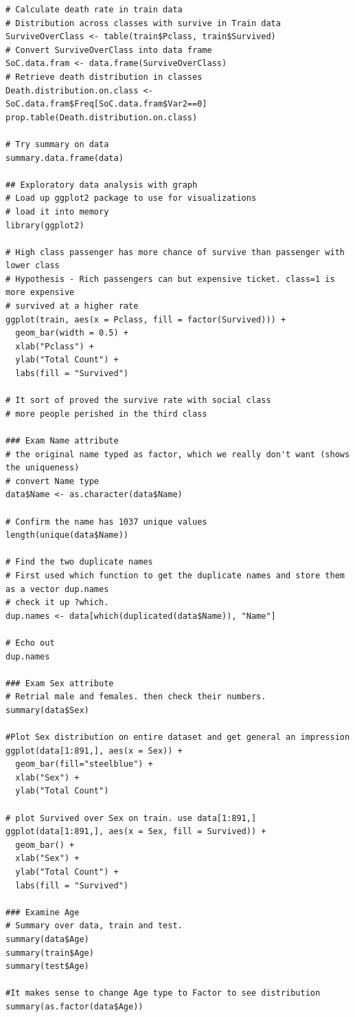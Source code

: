\documentclass[
]{book}
\begin{document}
\begin{verbatim}
# Calculate death rate in train data
# Distribution across classes with survive in Train data
SurviveOverClass <- table(train$Pclass, train$Survived)
# Convert SurviveOverClass into data frame
SoC.data.fram <- data.frame(SurviveOverClass)
# Retrieve death distribution in classes
Death.distribution.on.class <- SoC.data.fram$Freq[SoC.data.fram$Var2==0]
prop.table(Death.distribution.on.class)

# Try summary on data
summary.data.frame(data)

## Exploratory data analysis with graph
# Load up ggplot2 package to use for visualizations
# load it into memory
library(ggplot2)

# High class passenger has more chance of survive than passenger with lower class
# Hypothesis - Rich passengers can but expensive ticket. class=1 is more expensive
# survived at a higher rate
ggplot(train, aes(x = Pclass, fill = factor(Survived))) +
  geom_bar(width = 0.5) +
  xlab("Pclass") +
  ylab("Total Count") +
  labs(fill = "Survived")

# It sort of proved the survive rate with social class
# more people perished in the third class

### Exam Name attribute
# the original name typed as factor, which we really don't want (shows the uniqueness)
# convert Name type
data$Name <- as.character(data$Name)

# Confirm the name has 1037 unique values
length(unique(data$Name))

# Find the two duplicate names
# First used which function to get the duplicate names and store them as a vector dup.names
# check it up ?which.
dup.names <- data[which(duplicated(data$Name)), "Name"]

# Echo out
dup.names

### Exam Sex attribute
# Retrial male and females. then check their numbers.
summary(data$Sex)

#Plot Sex distribution on entire dataset and get general an impression
ggplot(data[1:891,], aes(x = Sex)) +
  geom_bar(fill="steelblue") +
  xlab("Sex") +
  ylab("Total Count")

# plot Survived over Sex on train. use data[1:891,]
ggplot(data[1:891,], aes(x = Sex, fill = Survived)) +
  geom_bar() +
  xlab("Sex") +
  ylab("Total Count") +
  labs(fill = "Survived")

### Examine Age
# Summary over data, train and test.
summary(data$Age)
summary(train$Age)
summary(test$Age)

#It makes sense to change Age type to Factor to see distribution
summary(as.factor(data$Age))


\end{verbatim}
\end{document}
